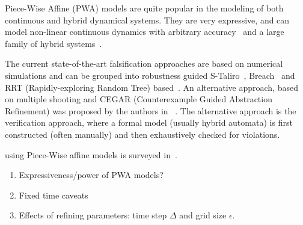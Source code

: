 Piece-Wise Affine (PWA) models are quite popular in the modeling of
both continuous and hybrid dynamical systems. They are very
expressive, and can model non-linear continuous dynamics with
arbitrary accuracy~\cite{wen2008basis} and a large family of hybrid
systems~\cite{heemels2001equivalence}.

 The current
state-of-the-art falsification approaches are based on numerical
simulations and can be grouped into robustness guided
S-Taliro~\cite{annpureddy2011s}, Breach~\cite{donze2010breach} and RRT
(Rapidly-exploring Random Tree)
based~\cite{nahhal_test_2007,Dang09,dreossi2015efficient}.  An
alternative approach, based on multiple shooting and CEGAR
(Counterexample Guided Abstraction Refinement) was proposed by the
authors in ~\cite{zutshi2014multiple}.  The alternative approach is
the verification approach, where a formal model (usually hybrid
automata) is first constructed (often manually) and then exhaustively
checked for violations.

 using Piece-Wise affine
models is surveyed in~\cite{paoletti2007identification}.
\begin{enumerate}
\item Expressiveness/power of PWA models?
\item Fixed time caveats
\item Effects of refining parameters: time step $\Delta$ and grid size $\epsilon$.
\end{enumerate}

